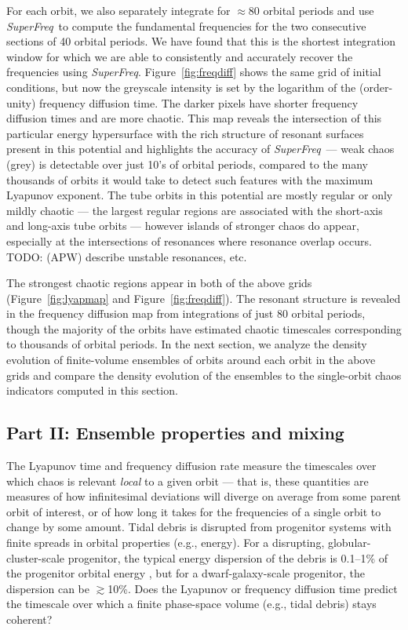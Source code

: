 \documentclass[letterpaper,12pt,preprint]{aastex}
\newcommand{\msun}{\ensuremath{\mathrm{M}_\odot}}
\newcommand{\project}[1]{\textsl{#1}}
\newcommand{\superfreq}{\project{SuperFreq}}
\newcommand{\todo}[2]{{\color{red} TODO: (\MakeUppercase{#1}) #2}}
\begin{document}
For each orbit, we also separately integrate for $\approx$80 orbital periods and use \superfreq\ to compute the fundamental frequencies for the two consecutive sections of 40 orbital periods. We have found that this is the shortest integration window for which we are able to consistently and accurately recover the frequencies using \superfreq. Figure~\ref{fig:freqdiff} shows the same grid of initial conditions, but now the greyscale intensity is set by the logarithm of the (order-unity) frequency diffusion time. The darker pixels have shorter frequency diffusion times and are more chaotic. This map reveals the intersection of this particular energy hypersurface with the rich structure of resonant surfaces present in this potential and highlights the accuracy of \superfreq\ --- weak chaos (grey) is detectable over just 10's of orbital periods, compared to the many thousands of orbits it would take to detect such features with the maximum Lyapunov exponent. The tube orbits in this potential are mostly regular or only mildly chaotic --- the largest regular regions are associated with the short-axis and long-axis tube orbits --- however islands of stronger chaos do appear, especially at the intersections of resonances where resonance overlap occurs. \todo{apw}{describe unstable resonances, etc.}

The strongest chaotic regions appear in both of the above grids (Figure~\ref{fig:lyapmap} and Figure~\ref{fig:freqdiff}). The resonant structure is revealed in the frequency diffusion map from integrations of just 80 orbital periods, though the majority of the orbits have estimated chaotic timescales corresponding to thousands of orbital periods. In the next section, we analyze the density evolution of finite-volume ensembles of orbits around each orbit in the above grids and compare the density evolution of the ensembles to the single-orbit chaos indicators computed in this section.

\subsection{Part II: Ensemble properties and mixing} \label{sec:results2}

The Lyapunov time and frequency diffusion rate measure the timescales over which chaos is relevant \emph{local} to a given orbit --- that is, these quantities are measures of how infinitesimal deviations will diverge on average from some parent orbit of interest, or of how long it takes for the frequencies of a single orbit to change by some amount. Tidal debris is disrupted from progenitor systems with finite spreads in orbital properties (e.g., energy). For a disrupting, globular-cluster-scale progenitor, the typical energy dispersion of the debris is 0.1--1\% of the progenitor orbital energy \citep[assuming masses of $10^4$--$10^5$~\msun;][]{johnston98}, but for a dwarf-galaxy-scale progenitor, the dispersion can be $\gtrsim$10\%. Does the Lyapunov or frequency diffusion time predict the timescale over which a finite phase-space volume (e.g., tidal debris) stays coherent?
\end{document}
